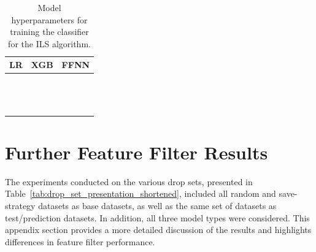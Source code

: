 \begin{table}[ht]
	\centering
	\small
	\caption{Model hyperparameters for training the classifier for the ILS algorithm.}
	\label{tab:hyperparams_model_performance}
	\renewcommand{\arraystretch}{1.1}
	\begin{tabular}{@{}c P{0.3\textwidth}P{0.3\textwidth}@{}}
		\toprule
		\textbf{LR}                  & \textbf{XGB}                    & \textbf{FFNN}                      \\
		\midrule
		             &  &  \\
		                  &       &                   \\
		           &              &                      \\
		         &          &               \\
		 &        &                    \\
		       &              &              \\
		             &      &             \\
		                             &             &               \\
		                             &            &                    \\
		                             &  &              \\
		                             &          &                    \\
		                             &                 &                                    \\
		                             &           &                                    \\
		\bottomrule
	\end{tabular}
\end{table}


\clearpage
\section{Further Feature Filter Results}
\label{app:sec:further_feature_filter}
The experiments conducted on the various drop sets, presented in Table~\ref{tab:drop_set_presentation_shortened}, included all
random and save-strategy datasets as base datasets, as well as the same set of datasets as test/prediction datasets.
In addition, all three model types were considered. This appendix section provides a more detailed discussion of the
results and highlights differences in feature filter performance.

